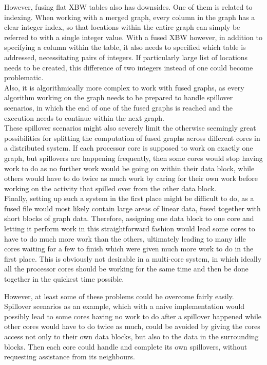 \documentclass[a4paper,12pt,twoside,BCOR=10mm]{scrbook}
\begin{document}
However, fusing flat XBW tables also has downsides. 
One of them is related to indexing. 
When working with a merged graph, every column in the graph has a clear integer index, 
so that locations within the entire graph can simply be referred to with a single integer value. 
With a fused XBW however, in addition to specifying a column within the table, 
it also needs to specified which table is addressed, necessitating pairs of integers. 
If particularly large list of locations needs to be created, this difference of two integers instead of one 
could become problematic. \\
Also, it is algorithmically more complex to work with fused graphs, as every 
algorithm working on the graph needs to be prepared to handle spillover scenarios, 
in which the end of one of the fused graphs is reached and the execution needs to continue 
within the next graph. \\
These spillover scenarios might also severely limit the otherwise seemingly 
great possibilities for splitting the computation of fused graphs across different 
cores in a distributed system. 
If each processor core is supposed to work on exactly one graph, 
but spillovers are happening frequently, then some cores would stop having work 
to do as no further work would be going on within their data block, 
while others would have to do twice as much work by caring for their 
own work before working on the activity that spilled over from the other data block. \\
Finally, setting up such a system in the first place might be difficult to do, 
as a fused file would most likely contain large areas of linear data, 
fused together with short blocks of graph data. Therefore, assigning one 
data block to one core and letting it perform work in this straightforward fashion 
would lead some cores to have to do much more work than the others, ultimately 
leading to many idle cores waiting for a few to finish which were given much more work 
to do in the first place. This is obviously not desirable in a multi-core system, 
in which ideally all the processor cores should be working for the same time 
and then be done together in the quickest time possible.

However, at least some of these problems could be overcome fairly easily. 
Spillover scenarios as an example, which with a naive 
implementation would possibly lead to some cores having no work to do 
after a spillover happened while other cores would have to do twice as much, 
could be avoided by giving the cores access not only to their own data blocks, 
but also to the data in the surrounding blocks. Then each core could handle 
and complete its own spillovers, without requesting assistance from its neighbours.
\end{document}
